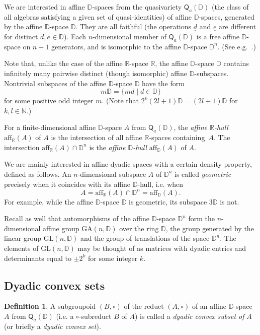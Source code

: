 \documentclass[12pt]{amsart}
\def\mr{\mathrm}
\def\mbR{\mathbb{R}}
\def\mbD{\mathbb{D}}
\theoremstyle{plain}
\theoremstyle{definition}
\newtheorem{definition}[theorem]{Definition}
\numberwithin{equation}{section}
\begin{document}
We are interested in affine $\mbD$-spaces from the quasivariety
$\mathsf{Q}_a(\mbD)$ (the class of all algebras satisfying a given set of quasi-identities) of affine $\mbD$-spaces, generated by the affine $\mbD$-space $\mbD$. They are all faithful (the operations $\underline{d}$ and $\underline{e}$ are different for distinct $d, e \in \mbD$). Each $n$-dimensional member of $\mathsf{Q}_a(\mbD)$ is a free affine $\mbD$-space on $n+1$ generators, and is isomorphic to the affine $\mbD$-space $\mbD^n$. (See e.g.~\cite{MMR23}.)


Note that, unlike the case of the affine $\mbR$-space $\mbR$, the affine $\mbD$-space $\mbD$
contains infinitely many pairwise distinct (though isomorphic) affine $\mbD$-subspaces.
Nontrivial subspaces of the affine $\mbD$-space $\mbD$ have the form
\[
m \mbD = \{md \mid d \in \mbD\}
\]
for some positive odd integer $m$. (Note that
$2^k (2l + 1) \mbD = (2l + 1) \mbD$ for $k,l\in\mathbb N$.)


For a finite-dimensional affine $\mbD$-space $A$ from $\mathsf{Q}_a(\mbD)$, the \emph{affine
$\mbR$-hull} $\mr{aff}_{\mbR}(A)$ of $A$ is the intersection of all affine $\mbR$-spaces
containing~$A$. The intersection $\mr{aff}_{\mbR}(A) \cap \mbD^n$ is the \emph{affine
$\mbD$-hull} $\mr{aff}_{\mbD}(A)$ of $A$.

We are mainly interested in affine dyadic spaces with a certain density property, defined as follows. An $n$-dimensional subspace $A$ of $\mbD^n$ is called \emph{geometric} precisely when it coincides with its affine $\mbD$-hull, i.e. when
\[
A = \mr{aff}_{\mbR}(A) \cap \mbD^n = \mr{aff}_{\mbD}(A).
\]
For example, while the affine $\mbD$-space $\mbD$ is geometric, its subspace $3\mbD$ is not.

Recall as well that automorphisms of the affine $\mbD$-space $\mbD^n$ form the $n$-dimensional
affine group $\mathrm{GA}(n,\mbD)$ over the ring $\mbD$, the group generated by the linear group $\mathrm{GL}(n,\mbD)$ and the group of translations of the space $\mbD^n$.   The elements of $\mathrm{GL}(n,\mbD)$ may be thought of as matrices with dyadic entries and determinants equal to $\pm 2^{k}$ for some integer $k$.


\subsection{Dyadic convex sets}

\begin{definition}\cite{CR13, MMR23}
A subgroupoid $(B, \circ)$ of the reduct $(A, \circ)$ of an affine $\mbD$-space $A$ from
$\mathsf{Q}_a(\mbD)$ (i.e. a $\circ$-subreduct $B$ of $A$) is called a \emph{dyadic convex
subset of} $A$ (or briefly a \emph{dyadic convex set}).
\end{definition}
\end{document}

